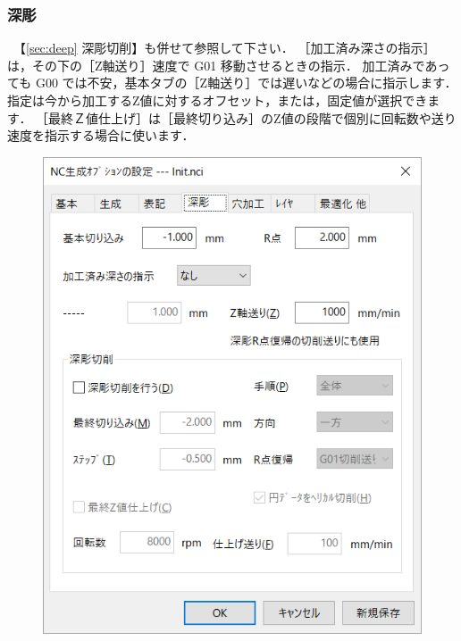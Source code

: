 \subsubsection{深彫}
\begin{minipage}[t]{0.5\textwidth}
　【\ref{sec:deep} 深彫切削】も併せて参照して下さい．
［加工済み深さの指示］は，その下の［Z軸送り］速度で G01 移動させるときの指示．
加工済みであっても G00 では不安，基本タブの［Z軸送り］では遅いなどの場合に指示します．
指定は今から加工するZ値に対するオフセット，または，固定値が選択できます．
［最終Ｚ値仕上げ］は［最終切り込み］のZ値の段階で個別に回転数や送り速度を指示する場合に使います．
\end{minipage}
\begin{minipage}[t]{0.5\textwidth}
\vspace*{-2zh}
\begin{figure}[H]
\centering
\includegraphics[scale=0.7]{No6/fig/init4.png}
\label{fig:init4.png}
\end{figure}
\end{minipage}

